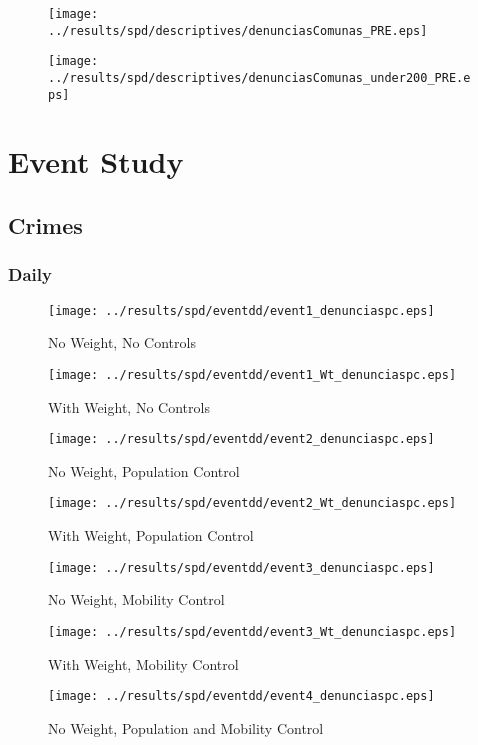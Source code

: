 \documentclass[11pt,letterpaper]{article}
\begin{document}
\begin{figure}[H]
\caption{}
\centering
\texttt{[image: ../results/spd/descriptives/denunciasComunas\_PRE.eps]}
\end{figure}

\begin{figure}[H]
\caption{}
\centering
\texttt{[image: ../results/spd/descriptives/denunciasComunas\_under200\_PRE.eps]}
\end{figure}

\section{Event Study}
	\subsection{Crimes}
		\subsubsection{Daily}
\begin{figure}[H]
\caption{No Weight, No Controls}
\centering
\texttt{[image: ../results/spd/eventdd/event1\_denunciaspc.eps]}
\end{figure}

\begin{figure}[H]
\caption{With Weight, No Controls}
\centering
\texttt{[image: ../results/spd/eventdd/event1\_Wt\_denunciaspc.eps]}
\end{figure}
\begin{figure}[H]
\caption{No Weight, Population Control}
\centering
\texttt{[image: ../results/spd/eventdd/event2\_denunciaspc.eps]}
\end{figure}

\begin{figure}[H]
\caption{With Weight, Population Control}
\centering
\texttt{[image: ../results/spd/eventdd/event2\_Wt\_denunciaspc.eps]}
\end{figure}
\begin{figure}[H]
\caption{No Weight, Mobility Control}
\centering
\texttt{[image: ../results/spd/eventdd/event3\_denunciaspc.eps]}
\end{figure}

\begin{figure}[H]
\caption{With Weight, Mobility Control}
\centering
\texttt{[image: ../results/spd/eventdd/event3\_Wt\_denunciaspc.eps]}
\end{figure}
\begin{figure}[H]
\caption{No Weight, Population and Mobility Control}
\centering
\texttt{[image: ../results/spd/eventdd/event4\_denunciaspc.eps]}
\end{figure}
\end{document}
